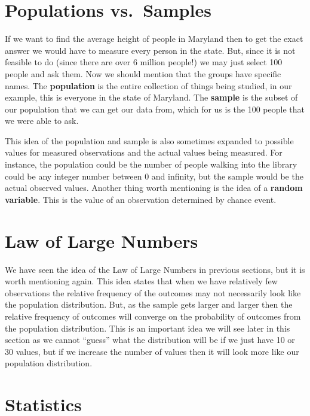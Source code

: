 \documentclass[
  letterpaper,
  DIV=11,
  numbers=noendperiod]{scrreprt}
\begin{document}
\section{Populations vs.~Samples}\label{populations-vs.-samples}

If we want to find the average height of people in Maryland then to get
the exact answer we would have to measure every person in the state.
But, since it is not feasible to do (since there are over 6 million
people!) we may just select 100 people and ask them. Now we should
mention that the groups have specific names. The \textbf{population} is
the entire collection of things being studied, in our example, this is
everyone in the state of Maryland. The \textbf{sample} is the subset of
our population that we can get our data from, which for us is the 100
people that we were able to ask.

This idea of the population and sample is also sometimes expanded to
possible values for measured observations and the actual values being
measured. For instance, the population could be the number of people
walking into the library could be any integer number between 0 and
infinity, but the sample would be the actual observed values. Another
thing worth mentioning is the idea of a \textbf{random variable}. This
is the value of an observation determined by chance event.

\section{Law of Large Numbers}\label{law-of-large-numbers}

We have seen the idea of the Law of Large Numbers in previous sections,
but it is worth mentioning again. This idea states that when we have
relatively few observations the relative frequency of the outcomes may
not necessarily look like the population distribution. But, as the
sample gets larger and larger then the relative frequency of outcomes
will converge on the probability of outcomes from the population
distribution. This is an important idea we will see later in this
section as we cannot ``guess'' what the distribution will be if we just
have 10 or 30 values, but if we increase the number of values then it
will look more like our population distribution.

\section{Statistics}\label{statistics}
\end{document}

